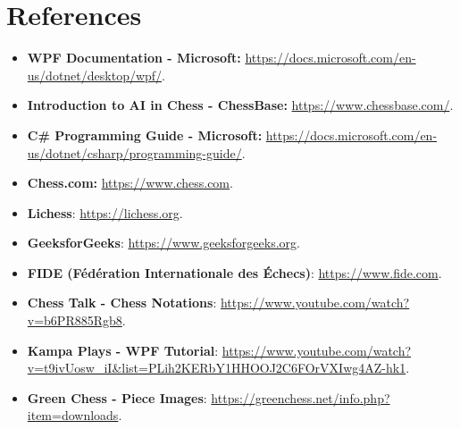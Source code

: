 \documentclass[a4paper,12pt]{article}
\begin{document}
\section{References}
\begin{itemize}
    \item \textbf{WPF Documentation - Microsoft:} \url{https://docs.microsoft.com/en-us/dotnet/desktop/wpf/}.
    \item \textbf{Introduction to AI in Chess - ChessBase:} \url{https://www.chessbase.com/}.
    \item \textbf{C\# Programming Guide - Microsoft:} \url{https://docs.microsoft.com/en-us/dotnet/csharp/programming-guide/}.
    \item \textbf{Chess.com:} \url{https://www.chess.com}. 
    \item \textbf{Lichess}: \url{https://lichess.org}. 
    \item \textbf{GeeksforGeeks}: \url{https://www.geeksforgeeks.org}.
    \item \textbf{FIDE (Fédération Internationale des Échecs)}: \url{https://www.fide.com}.
    \item \textbf{Chess Talk - Chess Notations}: \url{https://www.youtube.com/watch?v=b6PR885Rgb8}. 
    \item \textbf{Kampa Plays - WPF Tutorial}: \url{https://www.youtube.com/watch?v=t9ivUosw_iI&list=PLih2KERbY1HHOOJ2C6FOrVXIwg4AZ-hk1}.
    \item \textbf{Green Chess - Piece Images}:  \url{https://greenchess.net/info.php?item=downloads}. 
\end{itemize}
\end{document}
